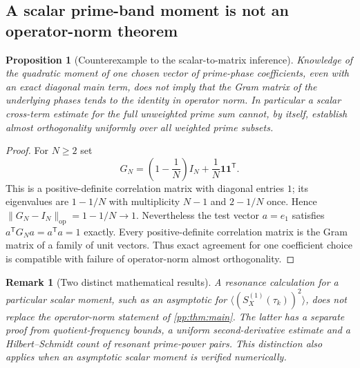 \documentclass[11pt,reqno]{amsart}
\numberwithin{equation}{section}
\newtheorem{proposition}[theorem]{Proposition}
\newtheorem{remark}[theorem]{Remark}
\begin{document}
\subsection{A scalar prime-band moment is not an operator-norm theorem}
\begin{proposition}[Counterexample to the scalar-to-matrix inference]
\label{prop:noscalarframe}
Knowledge of the quadratic moment of one chosen vector of prime-phase
coefficients, even with an exact diagonal main term, does not imply that the
Gram matrix of the underlying phases tends to the identity in operator norm.
In particular a scalar cross-term estimate for the full unweighted prime sum
cannot, by itself, establish almost orthogonality uniformly over all weighted
prime subsets.
\end{proposition}
\begin{proof}
For $N\ge2$ set
\[
G_N=\left(1-\frac1N\right)I_N+\frac1N\mathbf1\mathbf1^{\mathsf T}.
\]
This is a positive-definite correlation matrix with diagonal entries $1$;
its eigenvalues are $1-1/N$ with multiplicity $N-1$ and
$2-1/N$ once. Hence $\|G_N-I_N\|_{\mathrm{op}}=1-1/N\to1$.
Nevertheless the test vector $a=e_1$ satisfies
$a^{\mathsf T}G_Na=a^{\mathsf T}a=1$ exactly.
Every positive-definite correlation matrix is the Gram matrix of a family
of unit vectors. Thus exact agreement for one coefficient choice is
compatible with failure of operator-norm almost orthogonality.
\end{proof}
\begin{remark}[Two distinct mathematical results]
A resonance calculation for a particular scalar moment, such as an
asymptotic for
$\langle(S_X^{(1)}(\tau_k))^2\rangle$, does not replace the
operator-norm statement of \cref{pp:thm:main}. The latter has a
separate proof from quotient-frequency bounds, a uniform second-derivative
estimate and a Hilbert--Schmidt count of resonant \emph{prime-power} pairs.
This distinction also applies when an asymptotic scalar moment is verified
numerically.
\end{remark}
\end{document}
